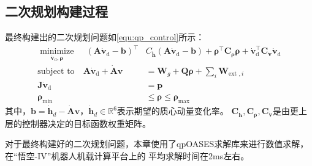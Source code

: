 \subsection{二次规划构建过程}
最终构建出的二次规划问题如\ref{equ:qp_control}所示：
\begin{equation}
    \label{equ:qp_control}
    \begin{aligned}
       \underset{{{{\dot{\boldsymbol{v}}}}_{\text{d}}},\boldsymbol{\rho}}{\mathop{\operatorname{minimize}}}\,\quad {{\left( \boldsymbol{A}{{{\dot{\boldsymbol{v}}}}_{\text{d}}}-\boldsymbol{b} \right)}^{\top }}&{{C}_{{\dot{\boldsymbol{h}}}}}\left( \boldsymbol{A}{{{\dot{\boldsymbol{v}}}}_{\text{d}}}-\boldsymbol{b} \right)+{{\boldsymbol{\rho} }^{\top }}{{\boldsymbol{C}}_{\boldsymbol{\rho} }}\boldsymbol{\rho} +\dot{\boldsymbol{v}}_{\text{d}}^{\top }{{\boldsymbol{C}}_{{\dot{\boldsymbol{v}}}}}{{{\dot{\boldsymbol{v}}}}_{\text{d}}} \\ 
        \text{subject to}\quad \boldsymbol{A}{{{\dot{\boldsymbol{v}}}}_{\text{d}}}+\dot{\boldsymbol{A}}\boldsymbol{v}&={\boldsymbol{{}W}_{g}}+\boldsymbol{Q}\boldsymbol{\rho} +\sum\limits_{i}{{{\boldsymbol{W}}_{\text{ext },i}}} \\ 
        \boldsymbol{J}{{{\dot{\boldsymbol{v}}}}_{\text{d}}}&=\boldsymbol{p} \\ 
        {{\boldsymbol{\rho} }_{\min }}&\le \boldsymbol{\rho} \le {{\boldsymbol{\rho} }_{\max }} 
      \end{aligned}
\end{equation}
其中，$\boldsymbol{b}={{\dot{\boldsymbol{h}}}_{d}}-\dot{\boldsymbol{A}}\boldsymbol{v}$，${{\dot{\boldsymbol{h}}}_{d}}\in {{\mathbb{R}}^{6}}$表示期望的质心动量变化率。
${{\boldsymbol{C}}_{{\dot{\boldsymbol{h}}}}},{\boldsymbol{{C}}_{\boldsymbol{\rho} }},{\boldsymbol{C}_{{\dot{\boldsymbol{v}}}}}$是由更上层的控制器决定的目标函数权重矩阵。

对于最终构建好的二次规划问题，本章使用了qpOASES求解库\cite{ferreau2014qpoases}来进行数值求解，在“悟空-IV”机器人机载计算平台上的
平均求解时间在2ms左右。
